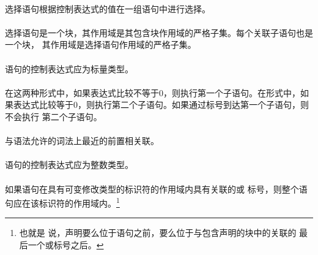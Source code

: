 {

\syntax
\paragraph{}

\semantic
\paragraph{}
选择语句根据控制表达式的值在一组语句中进行选择。

\paragraph{}
选择语句是一个块，其作用域是其包含块作用域的严格子集。每个关联子语句也是一个块，
其作用域是选择语句作用域的严格子集。

\constraint
\paragraph{}
语句的控制表达式应为标量类型。

\semantic
\paragraph{}
在这两种形式中，如果表达式比较不等于0，则执行第一个子语句。在形式中，如
果表达式比较等于0，则执行第二个子语句。如果通过标号到达第一个子语句，则不会执行
第二个子语句。

\paragraph{}
与语法允许的词法上最近的前置相关联。

\constraint
\paragraph{}
语句的控制表达式应为整数类型。

\paragraph{}
如果语句在具有可变修改类型的标识符的作用域内具有关联的或
标号，则整个语句应在该标识符的作用域内。\footnote{也就是
说，声明要么位于语句之前，要么位于与包含声明的块中的关联的
最后一个或标号之后。}

}

